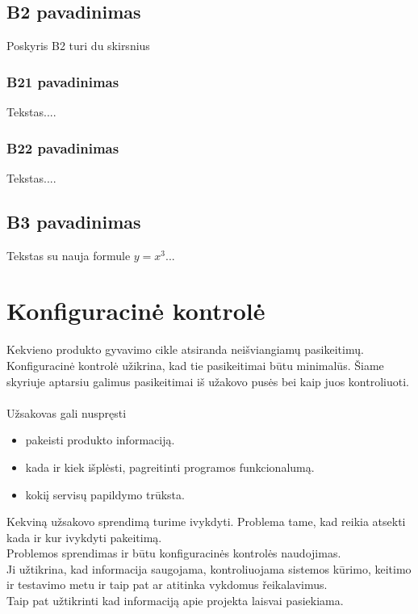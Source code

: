 \documentclass[a4paper,12pt]{article}
\begin{document}
 \subsection{B2 pavadinimas}
 Poskyris B2 turi du skirsnius
 \subsubsection{B21 pavadinimas}
  Tekstas....
  \subsubsection{B22 pavadinimas}
  Tekstas....
 \subsection{B3 pavadinimas}
 Tekstas su nauja formule $y=x^3$...
\clearpage 



\section{Konfiguracin\. e kontrol\. e}
Kekvieno produkto gyvavimo cikle atsiranda nei\v sviangiam\k u pasikeitim\k u.\\
Konfiguracin\. e kontrol\. e u\v zikrina, kad tie pasikeitimai b\= utu minimal\= us.
\v Siame skyriuje aptarsiu galimus pasikeitimai i\v s u\v zakovo pus\. es bei kaip juos kontroliuoti. \\
\\
U\v zsakovas gali nuspr\k esti
\begin{itemize}
	\item pakeisti produkto informacij\k a.
	\item kada ir kiek i\v spl\. esti, pagreitinti programos funkcionalum\k a.
	\item koki\k i servis\k u papildymo tr\= uksta.
\end{itemize}

Kekvin\k a u\v zsakovo sprendim\k a turime ivykdyti. Problema tame, kad reikia atsekti kada ir kur ivykdyti pakeitim\k a.\\
Problemos sprendimas ir b\= utu konfiguracin\. es kontrol\. es naudojimas.\\
Ji u\v ztikrina, kad informacija saugojama, kontroliuojama sistemos k\= urimo, keitimo ir testavimo metu ir taip pat ar atitinka vykdomus \v reikalavimus. \\
Taip pat u\v ztikrinti kad informacij\k a apie projekta laisvai pasiekiama.\\
\end{document}
